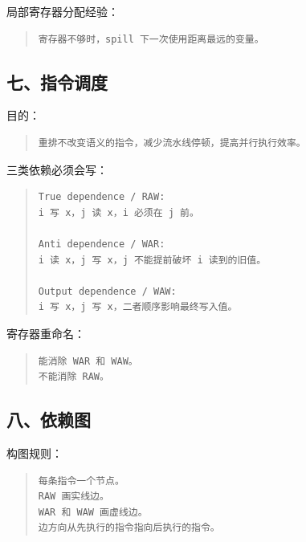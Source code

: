 \documentclass[UTF8,zihao=-4]{ctexart}
\begin{document}
局部寄存器分配经验：


\begin{quote}
\footnotesize
\begin{verbatim}
寄存器不够时，spill 下一次使用距离最远的变量。
\end{verbatim}
\end{quote}


\subsection{七、指令调度}


目的：


\begin{quote}
\footnotesize
\begin{verbatim}
重排不改变语义的指令，减少流水线停顿，提高并行执行效率。
\end{verbatim}
\end{quote}


三类依赖必须会写：


\begin{quote}
\footnotesize
\begin{verbatim}
True dependence / RAW:
i 写 x，j 读 x，i 必须在 j 前。

Anti dependence / WAR:
i 读 x，j 写 x，j 不能提前破坏 i 读到的旧值。

Output dependence / WAW:
i 写 x，j 写 x，二者顺序影响最终写入值。
\end{verbatim}
\end{quote}


寄存器重命名：


\begin{quote}
\footnotesize
\begin{verbatim}
能消除 WAR 和 WAW。
不能消除 RAW。
\end{verbatim}
\end{quote}


\subsection{八、依赖图}


构图规则：


\begin{quote}
\footnotesize
\begin{verbatim}
每条指令一个节点。
RAW 画实线边。
WAR 和 WAW 画虚线边。
边方向从先执行的指令指向后执行的指令。
\end{verbatim}
\end{quote}
\end{document}
